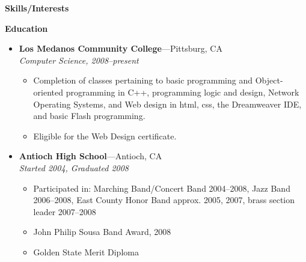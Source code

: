 \documentclass[11pt,oneside]{article}
\newenvironment{ressection}[1]{
	\vspace{4pt}
	{\textbf{\LARGE {\bigtxt #1}}}
	\begin{itemize}
	\vspace{2pt}
}{
	\end{itemize}
}
\newcommand{\resitem}[1]{
	\vspace{2.1pt}
	\item \begin{flushleft} #1 \end{flushleft}
}
\newcommand{\ressubitem}[1]{
	\vspace{-2pt}
	\item \begin{flushleft} #1 \end{flushleft}
}
\newcommand{\resbigitem}[3]{
	\vspace{-5pt}
	\item
	\textbf{#1}---#2 \\
	\textit{#3}
}
\newenvironment{ressubsec}[3]{
	\resbigitem{#1}{#2}{#3}
	\vspace{-4pt}
	\begin{itemize}
}{
	\end{itemize}
}
\newenvironment{reslist}[1]{
	\resitem{\textbf{#1}}
	\vspace{0pt}
	\begin{itemize}
}{
	\end{itemize}
}
\begin{document}
\begin{ressection}{Skills/Interests}
%
%
%
%
%
%
%


\end{ressection}



\begin{ressection}{Education}

    \begin{ressubsec}{Los Medanos Community College}{Pittsburg, CA}{Computer 
			Science, 2008--present}
		\ressubitem{Completion of classes pertaining to basic programming and 
		Object-oriented programming in C++, programming logic and design, 
		Network Operating Systems, and Web design in html, css, the Dreamweaver
		IDE, and basic Flash programming.}

        \ressubitem{Eligible for the Web Design certificate.}


    \end{ressubsec}

	\begin{ressubsec}{Antioch High School}{Antioch, CA}{Started 2004, Graduated 2008}
        \ressubitem{Participated in: Marching Band/Concert Band 2004--2008, Jazz Band 2006--2008, East County Honor Band approx. 2005, 2007, brass section leader 2007--2008}
        \ressubitem{John Philip Sousa Band Award, 2008}
		\ressubitem{Golden State Merit Diploma}
	\end{ressubsec}

\end{ressection}
\end{document}

